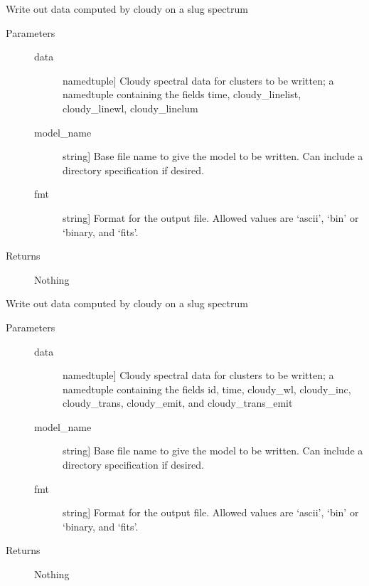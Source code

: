 \documentclass[letterpaper,10pt,english]{sphinxmanual}
\begin{document}
\begin{fulllineitems}
\label{cloudy:slugpy.cloudy.write_cluster_cloudylines}
Write out data computed by cloudy on a slug spectrum
\begin{description}
\item[{Parameters}] \leavevmode\begin{description}
\item[{data}] \leavevmode{[}namedtuple{]}
Cloudy spectral data for clusters to be written; a namedtuple
containing the fields time, cloudy\_linelist, cloudy\_linewl, 
cloudy\_linelum

\item[{model\_name}] \leavevmode{[}string{]}
Base file name to give the model to be written. Can include a
directory specification if desired.

\item[{fmt}] \leavevmode{[}string{]}
Format for the output file. Allowed values are `ascii', `bin'
or `binary, and `fits'.

\end{description}

\item[{Returns}] \leavevmode
Nothing

\end{description}

\end{fulllineitems}


\begin{fulllineitems}
\label{cloudy:slugpy.cloudy.write_cluster_cloudyspec}
Write out data computed by cloudy on a slug spectrum
\begin{description}
\item[{Parameters}] \leavevmode\begin{description}
\item[{data}] \leavevmode{[}namedtuple{]}
Cloudy spectral data for clusters to be written; a namedtuple
containing the fields id, time, cloudy\_wl, cloudy\_inc, cloudy\_trans,
cloudy\_emit, and cloudy\_trans\_emit

\item[{model\_name}] \leavevmode{[}string{]}
Base file name to give the model to be written. Can include a
directory specification if desired.

\item[{fmt}] \leavevmode{[}string{]}
Format for the output file. Allowed values are `ascii', `bin'
or `binary, and `fits'.

\end{description}

\item[{Returns}] \leavevmode
Nothing

\end{description}

\end{fulllineitems}
\end{document}
